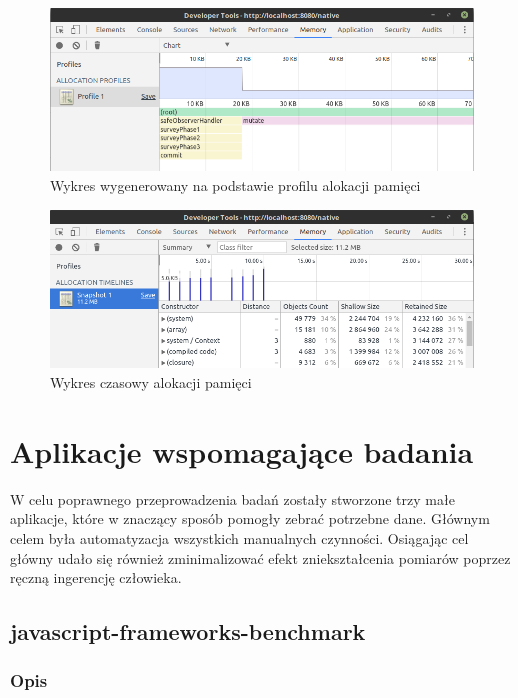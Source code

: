 \documentclass[polish, twoside, 12pt]{mwart}
\let\stdsection\section
\renewcommand*{\section}{\clearpage\stdsection}
\begin{document}
\begin{figure}[ht]
  \includegraphics[width=\textwidth]{chrome-devtools-performance-allocation-profile.png}
	\caption{Wykres wygenerowany na podstawie profilu alokacji pamięci}
\end{figure}

\begin{figure}[ht]
  \includegraphics[width=\textwidth]{chrome-devtools-performance-allocation-timeline.png}
	\caption{Wykres czasowy alokacji pamięci}
\end{figure}

\section{Aplikacje wspomagające badania}

W celu poprawnego przeprowadzenia badań zostały stworzone trzy małe aplikacje, które w znaczący sposób pomogły zebrać potrzebne dane. Głównym celem była automatyzacja wszystkich manualnych czynności. Osiągając cel główny udało się również zminimalizować efekt zniekształcenia pomiarów poprzez ręczną ingerencję człowieka.

\subsection{javascript-frameworks-benchmark}

\subsubsection{Opis}
\end{document}
